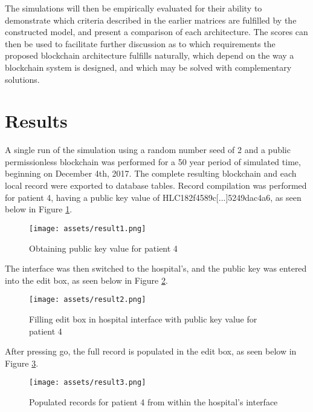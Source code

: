 \documentclass[12pt]{report}
\begin{document}
The simulations will then be empirically evaluated for their ability to demonstrate which criteria described in the earlier matrices are fulfilled by the constructed model, and present a comparison of each architecture. The scores can then be used to facilitate further discussion as to which requirements the proposed blockchain architecture fulfills naturally, which depend on the way a blockchain system is designed, and which may be solved with complementary solutions.
%
%
\section{Results}
\label{sec:resrx}
A single run of the simulation using a random number seed of 2 and a public permissionless blockchain was performed for a 50 year period of simulated time, beginning on December 4th, 2017. The complete resulting blockchain and each local record were exported to database tables.%
Record compilation was performed for patient 4, having a public key value of HLC182f4589c[...]5249dac4a6, as seen below in Figure \ref{fig:result1}. 

\begin{figure}[!h]
\texttt{[image: assets/result1.png]}
\caption{Obtaining public key value for patient 4}
\label{fig:result1}
\end{figure}

The interface was then switched to the hospital's, and the public key was entered into the edit box, as seen below in Figure \ref{fig:result2}. 

\begin{figure}[!h]
\texttt{[image: assets/result2.png]}
\caption{Filling edit box in hospital interface with public key value for patient 4}
\label{fig:result2}
\end{figure}

After pressing go, the full record is populated in the edit box, as seen below in Figure \ref{fig:result3}. 

\begin{figure}[!b]
\texttt{[image: assets/result3.png]}
\caption{Populated records for patient 4 from within the hospital's interface}
\label{fig:result3}
\end{figure}
\end{document}
